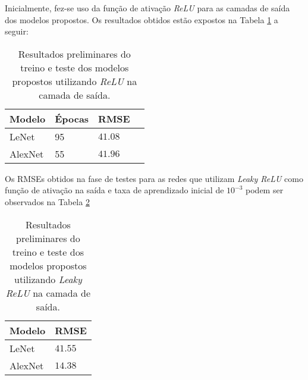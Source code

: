 
Inicialmente, fez-se uso da função de ativação \emph{ReLU} para as camadas de saída dos modelos propostos. Os resultados obtidos estão expostos na Tabela \ref{tab:results_relu} a seguir:
\begin{table}
     \caption{Resultados preliminares do treino e teste dos modelos propostos utilizando \emph{ReLU} na camada de saída.}
     \label{tab:results_relu}
     \centering
     \begin{tabular}{l l l l}
          \toprule
          Modelo & Épocas &RMSE \\
          \midrule
          LeNet & 95 & $41.08$ \\
          AlexNet & 55 & $41.96$
          \bottomrule
     \end{tabular}
\end{table}

Os RMSEs obtidos na fase de testes para as redes que utilizam \emph{Leaky ReLU} como função de ativação na saída e taxa de aprendizado inicial de $10^{-3}$ podem ser observados na Tabela \ref{tab:results_leaky}

\begin{table}[h!]
     \caption{Resultados preliminares do treino e teste dos modelos propostos utilizando \emph{Leaky ReLU} na camada de saída.}
     \label{tab:results_leaky}
     \centering
     \begin{tabular}{l l}
          \toprule
          Modelo & RMSE \\
          \midrule
          LeNet & $41.55$ \\
          AlexNet & $14.38$
          \bottomrule
     \end{tabular}
\end{table}
